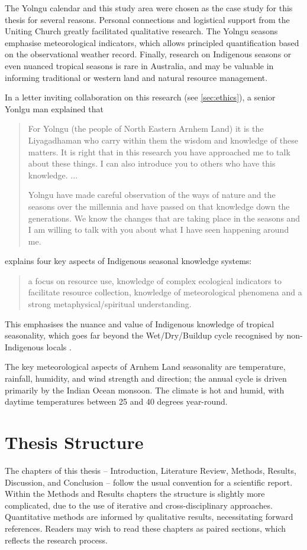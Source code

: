 The Yolngu calendar and this study area were chosen as the case study for
this thesis for several reasons.  Personal connections and logistical support
from the Uniting Church greatly facilitated qualitative research.  The
Yolngu seasons emphasise meteorological indicators, which allows principled
quantification based on the observational weather record.  Finally, research
on Indigenous seasons or even nuanced tropical seasons is rare in Australia,
and may be valuable in informing traditional or western land and natural
resource management.

In a letter inviting collaboration on this research (see \autoref{sec:ethics}),
a senior Yonlgu man explained that \blockquote{
    For Yolngu (the people of North Eastern Arnhem Land) it is the Liyagadhaman
    who carry within them the wisdom and knowledge of these matters.
    It is right that in this research you have approached me to talk about these
    things. I can also introduce you to others who have this knowledge.  ...

    Yolngu have made careful observation of the ways of nature and the seasons
    over the millennia and have passed on that knowledge down the generations.
    We know the changes that are taking place in the seasons and I am willing
    to talk with you about what I have seen happening around me.
}

\citet{woodward2012b} explains four key aspects of Indigenous seasonal
knowledge systems: \blockquote{a focus on resource use, knowledge of complex
    ecological indicators to facilitate resource collection, knowledge of
    meteorological phenomena and a strong metaphysical/spiritual understanding.}.
This emphasises the nuance and value of Indigenous knowledge of tropical
seasonality, which goes far beyond the Wet/Dry/Buildup cycle recognised
by non-Indigenous locals \citep{willmett2009}.

The key meteorological aspects of Arnhem Land seasonality are temperature,
rainfall, humidity, and wind strength and direction; the annual
cycle is driven primarily by the Indian Ocean monsoon.  The climate is hot and
humid, with daytime temperatures between 25 and 40 degrees year-round.



\section{Thesis Structure}

The chapters of this thesis -- Introduction, Literature Review, Methods,
Results, Discussion, and Conclusion -- follow the usual convention for
a scientific report.  Within the Methods and Results chapters
the structure is slightly more complicated, due to the use of iterative and
cross-disciplinary approaches.  Quantitative methods are informed by
qualitative results, necessitating forward references.  Readers may wish
to read these chapters as paired sections, which reflects the research
process.\\


